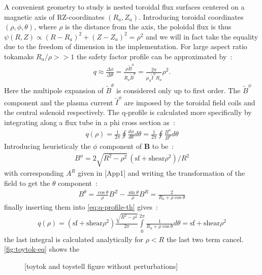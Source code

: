 A convenient geometry to study is nested toroidal flux surfaces centered on a magnetic axis of RZ-coordinates $(R_a, Z_a)$. Introducing toroidal coordinates $(\rho, \phi, \theta)$, where $\rho$ is the distance from the axis, the poloidal flux is thus $\psi(R, Z) \propto (R - R_a)^2 + (Z - Z_a)^2 = \rho^2$ and we will in fact take the equality due to the freedom of dimension in the implementation. For large aspect ratio tokamaks $R_a/\rho >> 1$ the safety factor profile can be approximated by~:
\begin{align*}
    q \approx \frac{\Delta\phi}{\Delta\theta} = \frac{\rho \tilde{B}^\phi}{R_a \tilde{B}^\theta} = \frac{2\pi}{\mu_0\tilde{I}^\phi R_a} \rho^2.
\end{align*}
Here the multipole expansion of $\tilde{B}^\theta$ is considered only up to first order. The $\tilde{B}^\phi$ component and the plasma current $\tilde{I}^\phi$ are imposed by the toroidal field coils and the central solenoid respectively. The q-profile is calculated more specifically by integrating along a flux tube in a phi cross section \cite[pp.111-112]{wesson_tokamaks_2011} as~:
\begin{align}\label{eq:q-profile-th}
    q(\rho) = \frac{1}{2\pi}\oint \frac{d\phi}{d\theta}d\theta = \frac{1}{2\pi}\oint \frac{B^\phi}{B^\theta}d\theta
\end{align}
Introducing heuristicaly the $\phi$ component of $\textbf{B}$ to be~:
\begin{align*}
    B^\phi = 2\sqrt{R^2-\rho^2}\,(\text{sf}+\text{shear}\rho^2)/R^2
\end{align*}
with corresponding $A^R$ given in [App1] and writing the transformation of the field to get the $\theta$ component~:
\begin{align*}
    B^\theta = \frac{\cos{\theta}}{\rho}B^Z - \frac{\sin{\theta}}{\rho}B^R = \frac{2}{R_a+\rho\cos{\theta}}
\end{align*}
finally inserting them into \eqref{eq:q-profile-th} gives~:
\begin{align*}
     q(\rho) = (\text{sf}+\text{shear}\rho^2)\frac{\sqrt{R^2-\rho^2}}{2\pi}\int\limits_{0}^{2\pi}\frac{1}{R_a + \rho\cos{\theta}}d\theta = \text{sf}+\text{shear}\rho^2
\end{align*}
the last integral is calculated analytically for $\rho < R$ the last two term cancel. \ref{fig:toytok-eq} shows the 

\begin{figure}[h!]
    \hfill
    \hfill
    \hfill
    \caption{[toytok and toystell figure without perturbations]}
    \label{fig:toytok-toystell}
\end{figure}

